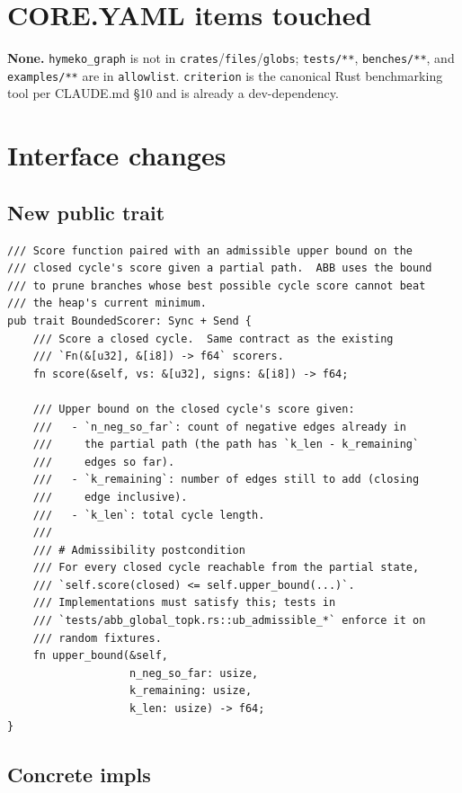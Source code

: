 \documentclass[a4paper,11pt]{article}
\begin{document}
\section*{CORE.YAML items touched}

\textbf{None.} \texttt{hymeko\_graph} is not in
\texttt{crates}/\texttt{files}/\texttt{globs}; \texttt{tests/**},
\texttt{benches/**}, and \texttt{examples/**} are in
\texttt{allowlist}. \texttt{criterion} is the canonical Rust
benchmarking tool per CLAUDE.md \S10 and is already a dev-dependency.

\section*{Interface changes}

\subsection*{New public trait}

\begin{lstlisting}
/// Score function paired with an admissible upper bound on the
/// closed cycle's score given a partial path.  ABB uses the bound
/// to prune branches whose best possible cycle score cannot beat
/// the heap's current minimum.
pub trait BoundedScorer: Sync + Send {
    /// Score a closed cycle.  Same contract as the existing
    /// `Fn(&[u32], &[i8]) -> f64` scorers.
    fn score(&self, vs: &[u32], signs: &[i8]) -> f64;

    /// Upper bound on the closed cycle's score given:
    ///   - `n_neg_so_far`: count of negative edges already in
    ///     the partial path (the path has `k_len - k_remaining`
    ///     edges so far).
    ///   - `k_remaining`: number of edges still to add (closing
    ///     edge inclusive).
    ///   - `k_len`: total cycle length.
    ///
    /// # Admissibility postcondition
    /// For every closed cycle reachable from the partial state,
    /// `self.score(closed) <= self.upper_bound(...)`.
    /// Implementations must satisfy this; tests in
    /// `tests/abb_global_topk.rs::ub_admissible_*` enforce it on
    /// random fixtures.
    fn upper_bound(&self,
                   n_neg_so_far: usize,
                   k_remaining: usize,
                   k_len: usize) -> f64;
}
\end{lstlisting}

\subsection*{Concrete impls}
\end{document}

